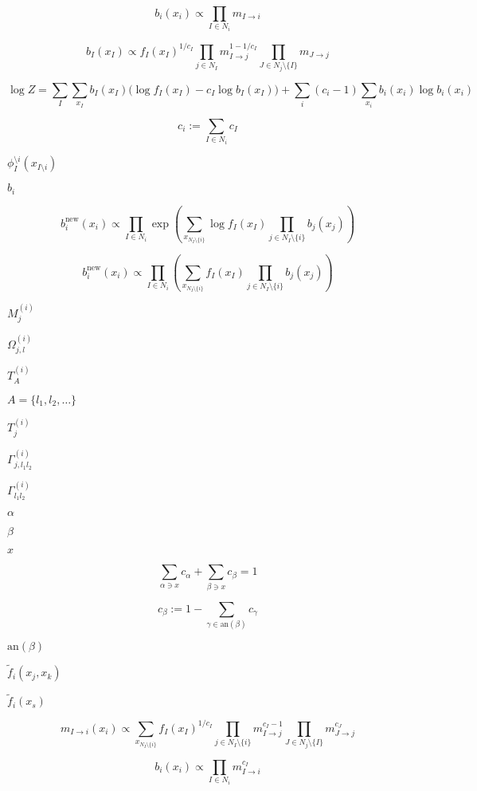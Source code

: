 \documentclass{article}
\begin{document}
\[ b_i(x_i) \propto \prod_{I\in N_i} m_{I\to i} \]
\pagebreak

\[ b_I(x_I) \propto f_I(x_I)^{1/c_I} \prod_{j \in N_I} m_{I\to j}^{1-1/c_I} \prod_{J\in N_j\setminus\{I\}} m_{J\to j} \]
\pagebreak

\[ \log Z = \sum_{I} \sum_{x_I} b_I(x_I) \big( \log f_I(x_I) - c_I \log b_I(x_I) \big) + \sum_{i} (c_i - 1) \sum_{x_i} b_i(x_i) \log b_i(x_i) \]
\pagebreak

\[ c_i := \sum_{I \in N_i} c_I \]
\pagebreak

$ \phi^{\setminus i}_I(x_{I \setminus i}) $
\pagebreak

$b_i$
\pagebreak

\[ b_i^{\mathrm{new}}(x_i) \propto \prod_{I\in N_i} \exp \left( \sum_{x_{N_I \setminus \{i\}}} \log f_I(x_I) \prod_{j \in N_I \setminus \{i\}} b_j(x_j) \right) \]
\pagebreak

\[ b_i^{\mathrm{new}}(x_i) \propto \prod_{I\in N_i} \left( \sum_{x_{N_I \setminus \{i\}}} f_I(x_I) \prod_{j \in N_I \setminus \{i\}} b_j(x_j) \right) \]
\pagebreak

$ M^{(i)}_j $
\pagebreak

$ \Omega^{(i)}_{j,l} $
\pagebreak

$ T^{(i)}_A $
\pagebreak

$ A = \{l_1,l_2,\dots\} $
\pagebreak

$ T^{(i)}_j $
\pagebreak

$ \Gamma^{(i)}_{j,l_1l_2} $
\pagebreak

$ \Gamma^{(i)}_{l_1l_2} $
\pagebreak

$\alpha$
\pagebreak

$\beta$
\pagebreak

$x$
\pagebreak

\[\sum_{\alpha \ni x} c_\alpha + \sum_{\beta \ni x} c_\beta = 1\]
\pagebreak

\[ c_\beta := 1 - \sum_{\gamma \in \mathrm{an}(\beta)} c_\gamma \]
\pagebreak

$\mathrm{an}(\beta)$
\pagebreak

$\tilde f_i(x_j,x_k)$
\pagebreak

$\tilde f_i(x_s)$
\pagebreak

\[ m_{I\to i}(x_i) \propto \sum_{x_{N_I\setminus\{i\}}} f_I(x_I)^{1/c_I} \prod_{j\in N_I\setminus\{i\}} m_{I\to j}^{c_I-1} \prod_{J\in N_j\setminus\{I\}} m_{J\to j}^{c_J} \]
\pagebreak

\[ b_i(x_i) \propto \prod_{I\in N_i} m_{I\to i}^{c_I} \]
\pagebreak
\end{document}
